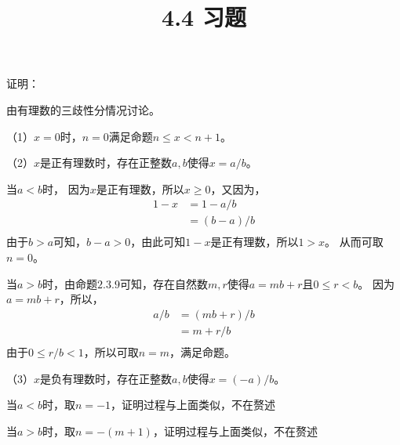 \documentclass{article}
\theoremstyle{mystyle}
\begin{document}
\title{4.4 习题}
\maketitle

证明：

由有理数的三歧性分情况讨论。

（1）$x = 0$时，$n=0$满足命题$n \leq x < n+1$。

（2）$x$是正有理数时，存在正整数$a,b$使得$x = a / b$。

当$a<b$时，
因为$x$是正有理数，所以$x \geq 0$，又因为，
\begin{align*}
  1 - x & = 1 - a/b \\
        & = (b-a)/b \\
\end{align*}
由于$b>a$可知，$b-a>0$，由此可知$1-x$是正有理数，所以$1 > x$。
从而可取$n=0$。

当$a>b$时，由命题$2.3.9$可知，存在自然数$m,r$使得$a=mb+r$且$0 \leq r < b$。
因为$a=mb+r$，所以，
\begin{align*}
  a/b & = (mb + r) / b \\
      & = m + r/b      \\
\end{align*}
由于$0 \leq r/b < 1$，所以可取$n=m$，满足命题。

（3）$x$是负有理数时，存在正整数$a,b$使得$x = (-a) / b$。

当$a<b$时，取$n=-1$，证明过程与上面类似，不在赘述

当$a>b$时，取$n=-(m+1)$，证明过程与上面类似，不在赘述
\end{document}
